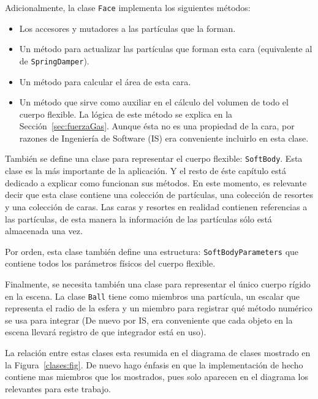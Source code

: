 Adicionalmente, la clase \texttt{Face} implementa los siguientes métodos:
\begin{itemize}
 \item Los accesores y mutadores a las partículas que la forman.
 \item Un método para actualizar las partículas que forman esta cara (equivalente al de \texttt{SpringDamper}).
 \item Un método para calcular el área de esta cara.
 \item Un método que sirve como auxiliar en el cálculo del volumen de todo el cuerpo flexible. La lógica de este método se explica en la Sección~\ref{sec:fuerzaGas}. Aunque ésta no es una propiedad de la cara, por razones de Ingeniería de Software (IS) era conveniente incluirlo en esta clase.
\end{itemize}

También se define una clase para representar el cuerpo flexible: \texttt{SoftBody}.
Esta clase es la más importante de la aplicación.
Y el resto de éste capítulo está dedicado a explicar como funcionan sus métodos.
En este momento, es relevante decir que esta clase contiene una colección de partículas, una colección de resortes y una colección de caras.
Las caras y resortes en realidad contienen referencias a las partículas, de esta manera la información de las partículas sólo está almacenada una vez.

Por orden, esta clase también define una estructura: \texttt{SoftBodyParameters} que contiene todos los parámetros físicos del cuerpo flexible. 
 
Finalmente, se necesita también una clase para representar el único cuerpo rígido en la escena.
La clase \texttt{Ball} tiene como miembros una partícula, un escalar que representa el radio de la esfera y un miembro para registrar qué método numérico se usa para integrar (De nuevo por IS, era conveniente que cada objeto en la escena llevará registro de que integrador está en uso).

La relación entre estas clases esta resumida en el diagrama de clases mostrado en la Figura~\ref{clases:fig}. De nuevo hago énfasis en que la implementación de hecho contiene mas miembros que los mostrados, pues solo aparecen en el diagrama los relevantes para este trabajo.

